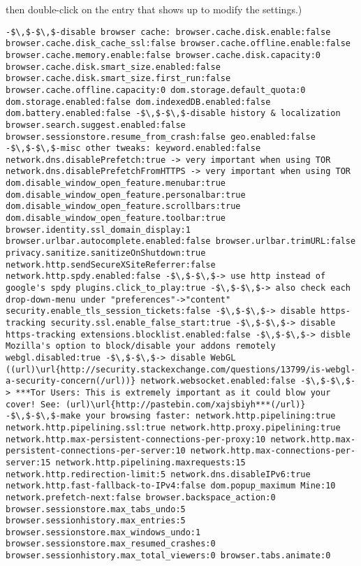 \documentclass{article}
\begin{document}
then double-click on the entry that shows up to modify the settings.)
\begin{lstlisting}
-$\,$-$\,$-disable browser cache: browser.cache.disk.enable:false 
browser.cache.disk_cache_ssl:false browser.cache.offline.enable:false browser.cache.memory.enable:false browser.cache.disk.capacity:0 browser.cache.disk.smart_size.enabled:false browser.cache.disk.smart_size.first_run:false browser.cache.offline.capacity:0 dom.storage.default_quota:0 dom.storage.enabled:false dom.indexedDB.enabled:false dom.battery.enabled:false -$\,$-$\,$-disable history & localization browser.search.suggest.enabled:false browser.sessionstore.resume_from_crash:false geo.enabled:false -$\,$-$\,$-misc other tweaks: keyword.enabled:false network.dns.disablePrefetch:true -> very important when using TOR network.dns.disablePrefetchFromHTTPS -> very important when using TOR dom.disable_window_open_feature.menubar:true dom.disable_window_open_feature.personalbar:true dom.disable_window_open_feature.scrollbars:true dom.disable_window_open_feature.toolbar:true browser.identity.ssl_domain_display:1 browser.urlbar.autocomplete.enabled:false browser.urlbar.trimURL:false privacy.sanitize.sanitizeOnShutdown:true network.http.sendSecureXSiteReferrer:false network.http.spdy.enabled:false -$\,$-$\,$-> use http instead of google's spdy plugins.click_to_play:true -$\,$-$\,$-> also check each drop-down-menu under "preferences"->"content" security.enable_tls_session_tickets:false -$\,$-$\,$-> disable https-tracking security.ssl.enable_false_start:true -$\,$-$\,$-> disable https-tracking extensions.blocklist.enabled:false -$\,$-$\,$-> disble Mozilla's option to block/disable your addons remotely webgl.disabled:true -$\,$-$\,$-> disable WebGL ((url)\url{http://security.stackexchange.com/questions/13799/is-webgl-a-security-concern(/url))} network.websocket.enabled:false -$\,$-$\,$-> ***Tor Users: This is extremely important as it could blow your cover! See: (url)\url{http://pastebin.com/xajsbiyh***(/url)} -$\,$-$\,$-make your browsing faster: network.http.pipelining:true network.http.pipelining.ssl:true network.http.proxy.pipelining:true network.http.max-persistent-connections-per-proxy:10 network.http.max-persistent-connections-per-server:10 network.http.max-connections-per-server:15 network.http.pipelining.maxrequests:15 network.http.redirection-limit:5 network.dns.disableIPv6:true network.http.fast-fallback-to-IPv4:false dom.popup_maximum Mine:10 network.prefetch-next:false browser.backspace_action:0 browser.sessionstore.max_tabs_undo:5 browser.sessionhistory.max_entries:5 browser.sessionstore.max_windows_undo:1 browser.sessionstore.max_resumed_crashes:0 browser.sessionhistory.max_total_viewers:0 browser.tabs.animate:0
\end{lstlisting}
\end{document}
